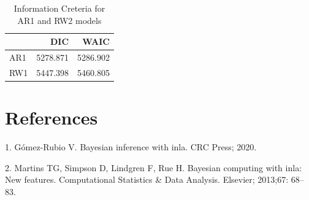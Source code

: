 \documentclass[10pt,letterpaper]{article}
\begin{document}
\begin{table}[!h]

\caption{\label{tab:unnamed-chunk-11}Information Creteria for AR1 and RW2 models}
\centering
\begin{tabular}[t]{l|r|r}
\hline
  & DIC & WAIC\\
\hline
AR1 & 5278.871 & 5286.902\\
\hline
RW1 & 5447.398 & 5460.805\\
\hline
\end{tabular}
\end{table}

\hypertarget{references}{%
\section*{References}\label{references}}

\hypertarget{refs}{}
\leavevmode\hypertarget{ref-gomez2020bayesian}{}%
1. Gómez-Rubio V. Bayesian inference with inla. CRC Press; 2020.

\leavevmode\hypertarget{ref-martins2013bayesian}{}%
2. Martins TG, Simpson D, Lindgren F, Rue H. Bayesian computing with
inla: New features. Computational Statistics \& Data Analysis. Elsevier;
2013;67: 68--83.

\nolinenumbers
\end{document}

